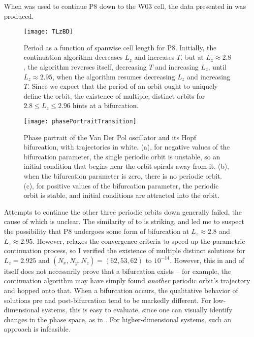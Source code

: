 When  was used to continue P8 down to the W03 cell, the data presented in  was produced.
\begin{figure}[b!]
\texttt{[image: TLzBD]}
\caption{Period as a function of spanwise cell length for P8. Initially, the continuation algorithm decreases $L_z$ and increases $T$, but at $L_z \approx 2.8$, the algorithm reverses itself, decreasing $T$ and increasing $L_z$, until $L_z \approx 2.95$, when the algorithm resumes decreasing $L_z$ and increasing $T$. Since we expect that the period of an orbit ought to uniquely define the orbit, the existence of multiple, distinct orbits for $2.8 \leq L_z \leq 2.96$ hints at a bifurcation.}\label{fig:LZBif}
\end{figure}
\begin{figure}[t]
\texttt{[image: phasePortraitTransition]}
\caption{Phase portrait of the Van Der Pol oscillator and its Hopf bifurcation, with trajectories in white. (a), for negative values of the bifurcation parameter, the single periodic orbit is unstable, so an initial condition that begins near the orbit spirals away from it. (b), when the bifurcation parameter is zero, there is no periodic orbit. (c), for positive values of the bifurcation parameter, the periodic orbit is stable, and initial conditions are attracted into the orbit.}\label{fig:phasePortrait}
\end{figure}
 Attempts to continue the other three periodic orbits down generally failed, the cause of which is unclear. The similarity of  to  is striking, and led me to suspect the possibility that P8 undergoes some form of bifurcation at $L_z \approx 2.8$ and $L_z \approx 2.95$. However,  relaxes the convergence criteria to speed up the parametric continuation process, so I verified the existence of multiple distinct solutions for $L_z = 2.925$ and $(N_x,N_y,N_z) = (62,53,62)$ to $10^{-14}$. However, this in and of itself does not necessarily prove that a bifurcation exists -- for example, the continuation algorithm may have simply found \emph{another} periodic orbit's trajectory and hopped onto that. When a bifurcation occurs, the qualitative behavior of solutions pre and post-bifurcation tend to be markedly different. For low-dimensional systems, this is easy to evaluate, since one can visually identify changes in the phase space, as in . For higher-dimensional systems, such an approach is infeasible. 

